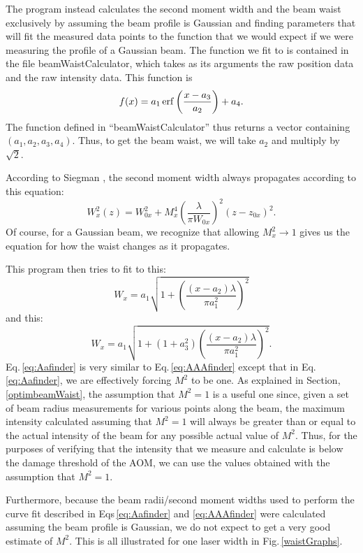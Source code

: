 The program instead calculates the second moment width and the beam waist exclusively by assuming the beam profile is Gaussian and finding parameters that will fit the measured data points to the function that we would expect if we were measuring the profile of a Gaussian beam. The function we fit to is contained in the file beamWaistCalculator, which takes as its arguments the raw position data and the raw intensity data. This function is 
\begin{equation}\label{fiterfeqn}
f(x)=a_1 \operatorname{erf} \left(\frac{x-a_3}{a_2}\right)+a_4.
\end{equation}
The function defined in ``beamWaistCalculator'' thus returns a vector containing $(a_1, a_2, a_3, a_4)$. Thus, to get the beam waist, we will take $a_2$ and multiply by $\sqrt{2}$. 

According to Siegman \cite{SiegmanBeamQuality}, the second moment width always propagates according to this equation: 
\begin{equation}
W_x^2(z)=W_{0x}^2 + M_x^4 \left( \frac{\lambda}{\pi W_{0x}}\right)^2 (z-z_{0x})^2. 
\end{equation}
Of course, for a Gaussian beam, we recognize that allowing $M_x^2\rightarrow 1$ gives us the equation for how the waist changes as it propagates. 

This program then tries to fit to this:
\begin{equation}
W_x=a_1 \sqrt{1+\left(\frac{(x-a_2) \lambda}{\pi a_1^2}\right)^2}\label{eq:Aafinder}
\end{equation}
and this:
\begin{equation}
W_x=a_1 \sqrt{1+(1+a_3^2) \left(\frac{(x-a_2) \lambda}{\pi a_1^2}\right)^2}.\label{eq:AAAfinder} 
\end{equation}
Eq.\,\ref{eq:Aafinder} is very similar to Eq.\,\ref{eq:AAAfinder} except that in Eq.\,\ref{eq:Aafinder}, we are effectively forcing $M^2$ to be one. As explained in Section,\ref{optimbeamWaist}, the assumption that $M^2=1$ is a useful one since, given a set of beam radius measurements for various points along the beam, the maximum intensity calculated assuming that $M^2=1$ will always be greater than or equal to the actual intensity of the beam for any possible actual value of $M^2$. Thus, for the purposes of verifying that the intensity that we measure and calculate is below the damage threshold of the AOM, we can use the values obtained with the assumption that $M^2=1$. 

Furthermore, because the beam radii/second moment widths used to perform the curve fit described in Eqs\,\ref{eq:Aafinder} and \ref{eq:AAAfinder} were calculated assuming the beam profile is Gaussian, we do not expect to get a very good estimate of $M^2$. This is all illustrated for one laser width in Fig.\,\ref{waistGraphs}.

